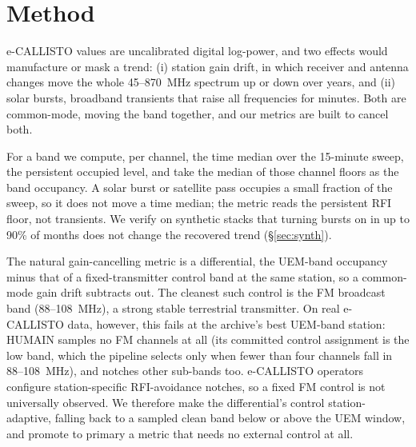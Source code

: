\documentclass[twocolumn]{aastex631}
\begin{document}
\section{Method}
\label{sec:method}
e-CALLISTO values are uncalibrated digital log-power, and two effects
would manufacture or mask a trend: (i) station gain drift, in which receiver and antenna changes
move the whole 45--870~MHz spectrum up or down over years, and (ii) solar bursts,
broadband transients that raise all frequencies for minutes. Both are common-mode, moving
the band together, and our metrics are built to cancel both.

For a band we compute, per channel, the time median over the
15-minute sweep, the persistent occupied level, and take the median of those channel floors
as the band occupancy. A solar burst or satellite pass occupies a small fraction of the sweep, so
it does not move a time median; the metric reads the persistent RFI floor, not transients. We
verify on synthetic stacks that turning bursts on in up to 90\% of months does not change the
recovered trend (\S\ref{sec:synth}).

The natural gain-cancelling metric is a
differential, the UEM-band occupancy minus that of a fixed-transmitter control band at the
same station, so a common-mode gain drift subtracts out. The cleanest such control is the FM
broadcast band (88--108~MHz), a strong stable terrestrial transmitter. On real e-CALLISTO data,
however, this fails at the archive's best UEM-band station: HUMAIN samples no FM channels at all
(its committed control assignment is the low band, which the pipeline selects only when fewer than
four channels fall in 88--108~MHz), and notches other sub-bands too. e-CALLISTO operators configure station-specific RFI-avoidance notches,
so a fixed FM control is not universally observed. We therefore make the differential's control
station-adaptive, falling back to a sampled clean band below or above the UEM window, and
promote to primary a metric that needs no external control at all.
\end{document}

